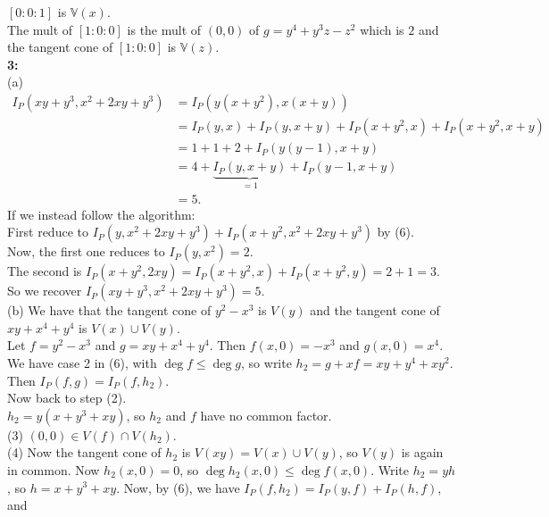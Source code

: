 \documentclass[a4paper]{article}
\begin{document}
    $\left[ 0:0:1 \right] $ is
    $\mathbb{V}(x)$.\\
    The mult of $\left[ 1 : 0 : 0 \right] $ is the mult of $(0,0)$ of
    $g = y^{4} + y^3 z - z^2$ which is $2$ and the tangent cone of
    $\left[ 1 : 0 : 0 \right] $ is $\mathbb{V}(z)$.\\
    \linebreak
    \textbf{3:}\\
    (a) 
    \begin{align*}
        I_P (xy+y^3, x^2 + 2xy + y^3)
        &= I_P \left( y(x+y^2) , x(x+y) \right)\\
        &= I_P(y,x) + I_P(y,x+y) + I_P(x+y^2,x) + I_P(x+y^2 , x+y)\\
        &= 1 + 1 + 2 + I_P(y(y-1), x+y)\\
        &= 4 + \underbrace{I_P(y,x+y)}_{=1} + I_P(y-1, x+y)\\
        &= 5.
    \end{align*}
    If we instead follow the algorithm:\\
    First reduce to
    $I_P(y,x^2 + 2xy + y^3) + I_P(x + y^2, x^2 + 2xy + y^3)$ by (6).\\
    Now, the first one reduces to $I_P(y,x^2) = 2$.\\
    The second is $I_P (x+y^2, 2xy) = I_P (x+y^2, x) + I_P(x+y^2, y)
    = 2 + 1 = 3$.\\
    So we recover $I_P\left( xy + y^3, x^2 + 2xy + y^3 \right) = 5 $.\\
    \linebreak
    (b) We have
    that the tangent cone of $y^2 - x^3$ is $V(y)$ and
    the tangent cone of $xy + x^{4} + y^{4}$ is 
    $V(x) \cup V(y)$.\\
    Let $f = y^2 - x^3$ and $g = xy + x^{4} + y^{4}$. Then
    $f(x,0) = -x^3$ and $g(x,0) = x^{4}$.\\
    We have case 2 in (6), with $\deg f \le \deg g$, so write
    $h_2 = g + xf = xy + y^{4} + xy^2$. Then
    $I_P(f,g) = I_P(f,h_2)$.\\
    Now back to step (2).\\
    $h_2 = y (x+y^3 + xy)$, so  $h_2$ and $f$ have no common factor.\\
    (3)  $(0,0) \in V(f) \cap V(h_2)$.\\
    (4) Now the tangent cone of  $h_2$ is $V(xy) = V(x)\cup  V(y)$, so
    $V(y)$ is again in common. Now $h_2(x,0) = 0$, so
    $\deg h_2(x,0) \le \deg f(x,0)$. Write
    $h_2 = y h$, so $h = x+ y^3 + xy$. Now, by (6), we have
    $I_P(f,h_2) = I_P(y, f) + I_P(h,f)$, and
\end{document}
